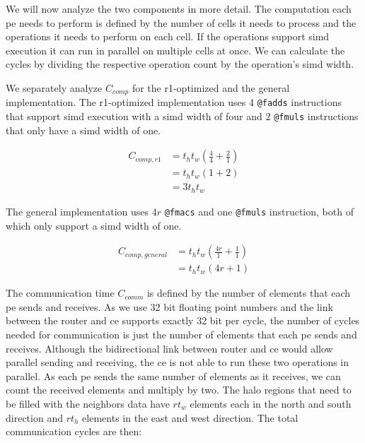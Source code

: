 We will now analyze the two components in more detail. The computation each \ac{pe} needs to perform is defined by the number of cells it needs to process and the operations it needs to perform on each cell. If the operations support \ac{simd} execution it can run in parallel on multiple cells at once. We can calculate the cycles by dividing the respective operation count by the operation's \ac{simd} width.

We separately analyze $C_{comp}$ for the r1-optimized and the general implementation. The r1-optimized implementation uses 4 \texttt{@fadds} instructions that support \ac{simd} execution with a \ac{simd} width of four and 2 \texttt{@fmuls} instructions that only have a \ac{simd} width of one.

\begin{equation}
    \begin{aligned}
        \label{eq:c_comp_r1}
        C_{comp,r1} &= t_h t_w \left(\frac{4}{4} + \frac{2}{1}\right) \\
        &= t_h t_w \left(1 + 2\right) \\
        &= 3 t_h t_w
    \end{aligned}
\end{equation}

The general implementation uses $4r$ \texttt{@fmacs} and one \texttt{@fmuls} instruction, both of which only support a \ac{simd} width of one.

\begin{equation}
    \label{eq:c_comp_general}
    \begin{aligned}
        C_{comp,general} &= t_h t_w \left(\frac{4r}{1} + \frac{1}{1}\right) \\
        &= t_h t_w \left(4r + 1\right)
    \end{aligned}
\end{equation}


The communication time $C_{comm}$ is defined by the number of elements that each \ac{pe} sends and receives. As we use 32 bit floating point numbers and the link between the router and \ac{ce} supports exactly 32 bit per cycle, the number of cycles needed for communication is just the number of elements that each \ac{pe} sends and receives. Although the bidirectional link between router and \ac{ce} would allow parallel sending and receiving, the \ac{ce} is not able to run these two operations in parallel. As each \ac{pe} sends the same number of elements as it receives, we can count the received elements and multiply by two. The halo regions that need to be filled with the neighbors data have $r t_w$ elements each in the north and south direction and $r t_h$ elements in the east and west direction. The total communication cycles are then:

